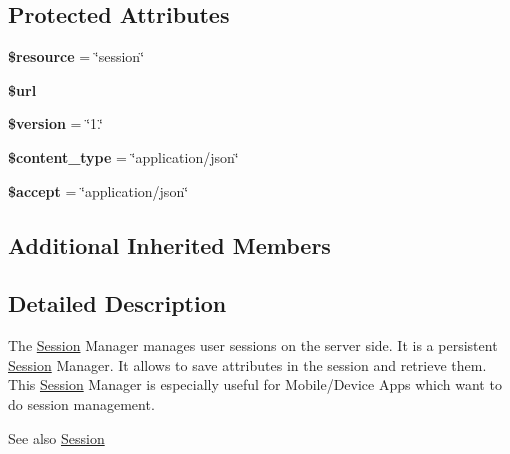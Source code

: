 \subsection*{Protected Attributes}
\begin{DoxyCompactItemize}
\item 
\hypertarget{class_session_service_abd4c7b8b084214b8d2533ba07fce6b83}{{\bfseries \$resource} = \char`\"{}session\char`\"{}}\label{class_session_service_abd4c7b8b084214b8d2533ba07fce6b83}

\item 
\hypertarget{class_session_service_acf215f34a917d014776ce684a9ee8909}{{\bfseries \$url}}\label{class_session_service_acf215f34a917d014776ce684a9ee8909}

\item 
\hypertarget{class_session_service_a17c8948c68aa44fa9961ae169b6a8961}{{\bfseries \$version} = \char`\"{}1.\char`\"{}}\label{class_session_service_a17c8948c68aa44fa9961ae169b6a8961}

\item 
\hypertarget{class_session_service_ae754d6373f275e781f47c8bc9b994b6d}{{\bfseries \$content\+\_\+type} = \char`\"{}application/json\char`\"{}}\label{class_session_service_ae754d6373f275e781f47c8bc9b994b6d}

\item 
\hypertarget{class_session_service_a75fc18c4ff06288ff9fdf8aba9bd1081}{{\bfseries \$accept} = \char`\"{}application/json\char`\"{}}\label{class_session_service_a75fc18c4ff06288ff9fdf8aba9bd1081}

\end{DoxyCompactItemize}
\subsection*{Additional Inherited Members}


\subsection{Detailed Description}
The \hyperlink{class_session}{Session} Manager manages user sessions on the server side. It is a persistent \hyperlink{class_session}{Session} Manager. It allows to save attributes in the session and retrieve them. This \hyperlink{class_session}{Session} Manager is especially useful for Mobile/\+Device Apps which want to do session management.

\begin{DoxySeeAlso}{See also}
\hyperlink{class_session}{Session} 
\end{DoxySeeAlso}


